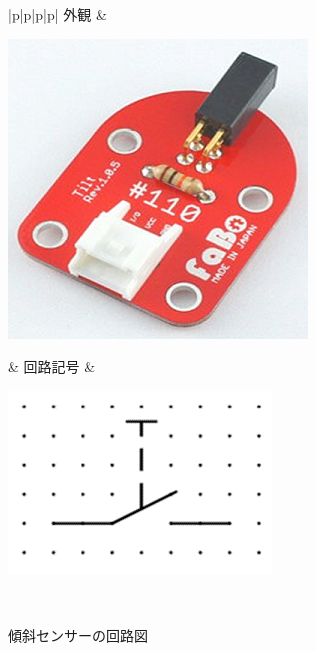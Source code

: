 \begin{figure}[H]
	\begin{tabular}{|p{\colH}|p{\colI}|p{\colH}|p{\colI}|} \hline
	外観 & 
	\begin{minipage}[t]{\linewidth}
    \smallskip
      \centering
      \includegraphics[width=\linewidth]{images/chap05/text05-img018.png}
      \caption{傾斜センサー}
      \smallskip
    \end{minipage} &
    回路記号 & 
    \begin{minipage}[t]{\linewidth}
    \smallskip
      \centering
      \includegraphics[width=\linewidth]{images/chap05/text05-img047.png}
      \caption{傾斜センサーの回路図}
      \smallskip
    \end{minipage}\\ \hline
  \end{tabular}
\end{figure}